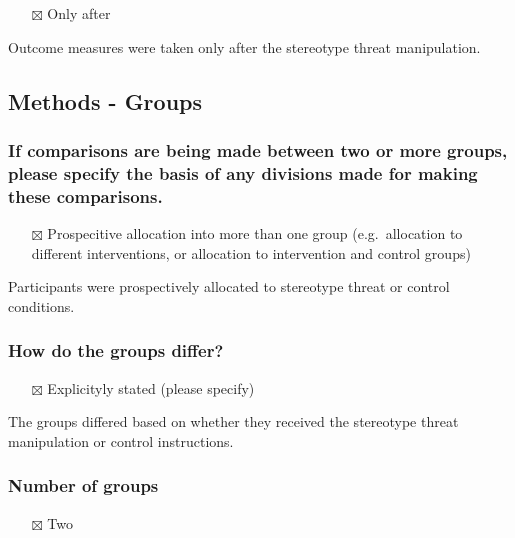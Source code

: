\documentclass[
  doc, a4paper]{apa7}
\providecommand{\tightlist}{%
  \setlength{\itemsep}{0pt}\setlength{\parskip}{0pt}}
\begin{document}
\begin{itemize}
\tightlist
\item[$\boxtimes$]
  Only after
\end{itemize}

Outcome measures were taken only after the stereotype threat manipulation.

\subsection{Methods - Groups}\label{methods---groups}

\subsubsection{If comparisons are being made between two or more groups, please specify the basis of any divisions made for making these comparisons.}\label{if-comparisons-are-being-made-between-two-or-more-groups-please-specify-the-basis-of-any-divisions-made-for-making-these-comparisons.}

\begin{itemize}
\tightlist
\item[$\boxtimes$]
  Prospecitive allocation into more than one group (e.g.~allocation to different interventions, or allocation to intervention and control groups)
\end{itemize}

Participants were prospectively allocated to stereotype threat or control conditions.

\subsubsection{How do the groups differ?}\label{how-do-the-groups-differ}

\begin{itemize}
\tightlist
\item[$\boxtimes$]
  Explicityly stated (please specify)
\end{itemize}

The groups differed based on whether they received the stereotype threat manipulation or control instructions.

\subsubsection{Number of groups}\label{number-of-groups}

\begin{itemize}
\tightlist
\item[$\boxtimes$]
  Two
\end{itemize}
\end{document}
